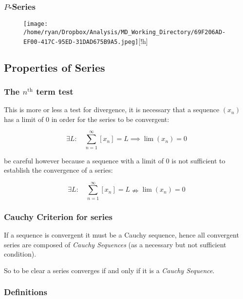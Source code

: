 \documentclass[
]{article}
\begin{document}
\hypertarget{header-n3157}{%
\subsubsection{\texorpdfstring{\(P\)-Series}{P-Series}}\label{header-n3157}}

\begin{figure}
\centering
\texttt{[image: /home/ryan/Dropbox/Analysis/MD\_Working\_Directory/69F206AD-EF00-417C-95ED-31DAD675B9A5.jpeg]}[!h]
\caption{}
\end{figure}

\newpage
\hypertarget{header-n3160}{%
\subsection{Properties of Series}\label{header-n3160}}

\hypertarget{header-n3161}{%
\subsubsection{\texorpdfstring{The \(n^\text{th}\) term
test}{The n\^{}\textbackslash text\{th\} term test}}\label{header-n3161}}

This is more or less a test for divergence, it is necessary that a
sequence \((x_n)\) has a limit of 0 in order for the series to be
convergent:

\[\exists L : \quad \sum_{n=1}^\infty \left[ x_n \right] = L \implies \lim(x_n)=0\]

be careful however because a sequence with a limit of 0 is not
sufficient to establish the convergence of a series:

\[\exists L : \quad \sum_{n=1}^\infty \left[ x_n \right] = L \nRightarrow \lim(x_n)=0\]

\hypertarget{header-n3167}{%
\subsubsection{Cauchy Criterion for series}\label{header-n3167}}

If a sequence is convergent it must be a Cauchy sequence, hence all
convergent series are composed of \emph{Cauchy Sequences} (as a
necessary but not sufficient condition).

So to be clear a series converges if and only if it is a \emph{Cauchy
Sequence}.

\hypertarget{header-n3170}{%
\subsubsection{Definitions}\label{header-n3170}}
\end{document}
